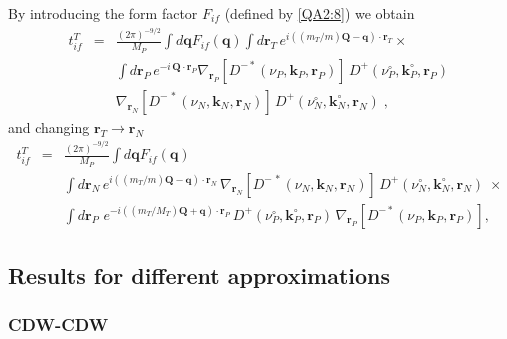 By introducing the form factor $F_{if}$ (defined by \ref{QA2:8}) we
obtain
\begin{eqnarray}\label{Q:tt_if}
t^{T}_{if}&=& \frac{(2 \pi)^{-9/2}}{M_{P}} \int d \bm{q}
F_{if}(\bm{q}) \int d \bm{r}_{T} \, e^{i \left(
(m_{T}/m)\bm{Q} - \bm{q} \right) \cdot \bm{r}_{T}} {\times}
  \\
&& \int d \bm{r}_{P} \, e^{- i \, \bm{Q} \cdot \bm{r}_{P}}
\nabla_{\bm{r}_{P}}\left[ D^{-*}(\nu_{P},\bm{k}_{P},\bm{r}_{P}) \right]
\,
D^{+}(\nu_{P}^{\circ},\bm{k}_{P}^{\circ},\bm{r}_{P}) \, \\
&& \nabla_{\bm{r}_{N}} \left[ D^{-\,\ast}(\nu_{N}, \bm{k}_{N},
\bm{r}_{N} ) \right] \, D^{+}(\nu_{N}^{\circ}, \bm{k}_{N}^{\circ}, \bm{r}_{N}) \;
,\nonumber
\end{eqnarray}
%
and changing $\bm{r}_{T}\to \bm{r}_{N}$
\begin{eqnarray} \label{Q:tifcdws2}
t^{T}_{if}&=& \frac{(2 \pi)^{-9/2}}{M_{P}} \int d \bm{q}
F_{if}(\bm{q})
\\
&& \int d \bm{r}_{N} \, e^{i \left( (m_{T}/m)\bm{Q} - \bm{q}
\right) \cdot \bm{r}_{N}} \, \nabla_{\bm{r}_{N}} \left[
D^{-\,\ast}(\nu_{N}, \bm{k}_{N}, \bm{r}_{N} ) \right] \,
D^{+}(\nu_{N}^{\circ},\bm{k}_{N}^{\circ},\bm{r}_{N})\; {\times}
  \\
&& \int d \bm{r}_{P} \, \,e^{ -i \left((m_{T}/M_{T})\bm{Q}+
\bm{q} \right) \cdot \bm{r}_{P}} \,
D^{+}(\nu_{P}^{\circ},\bm{k}_{P}^{\circ},\bm{r}_{P}) \, \nabla_{\bm{r}_{P}}\left[
D^{-*}(\nu_{P},\bm{k}_{P},\bm{r}_{P}) \right] ,\nonumber
\end{eqnarray}

\subsection{Results for different approximations}


\subsubsection{CDW-CDW}

